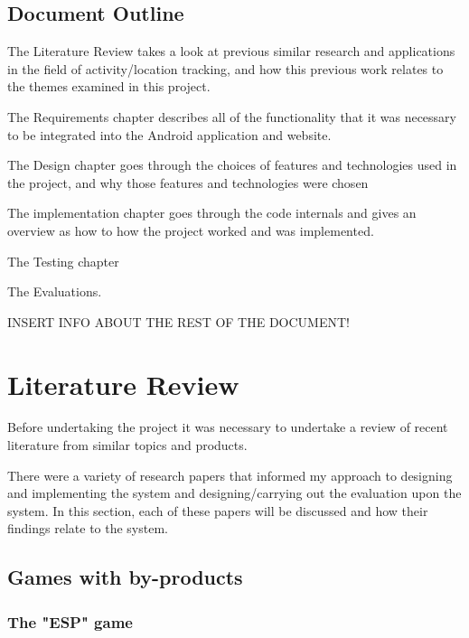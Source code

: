 \documentclass{l4proj}
\begin{document}
\section{Document Outline}

The Literature Review takes a look at previous similar research and applications in the field of activity/location tracking, and how this previous work relates to the themes examined in this project.

The Requirements chapter describes all of the functionality that it was necessary to be integrated into the Android application and website.

The Design chapter goes through the choices of features and technologies used in the project, and why those features and technologies were chosen

The implementation chapter goes through the code internals and gives an overview as how to how the project worked and was implemented.

The Testing chapter

The Evaluations.

INSERT INFO ABOUT THE REST OF THE DOCUMENT!


\chapter{Literature Review}

Before undertaking the project it was necessary to undertake a review of recent literature from similar topics and products.

There were a variety of research papers that informed my approach to designing and implementing the system and designing/carrying out the evaluation upon the system. In this section, each of these papers will be discussed and how their findings relate to the system.

\section{Games with by-products}

\subsection{The "ESP" game}
\end{document}
